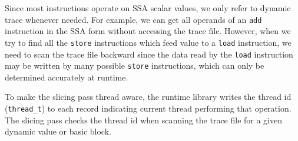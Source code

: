 \documentclass[DIV=calc, paper=a4, fontsize=11pt, twocolumn]{scrartcl}
\begin{document}
Since most instructions operate on SSA scalar values, we only refer to dynamic trace whenever needed.
For example, we can get all operands of an \texttt{add} instruction in the SSA form without accessing the trace file.
However, when we try to find all the \texttt{store} instructions which feed value to a \texttt{load} instruction,
we need to scan the trace file backward since the data read by the \texttt{load} instruction may be written by many possible \texttt{store} instructions,
which can only be determined accurately at runtime.

To make the slicing pass thread aware,
the runtime library writes the thread id (\texttt{thread\_t}) to each record indicating current thread performing that operation.
The slicing pass checks the thread id when scanning the trace file for a given dynamic value or basic block.

\end{document}
